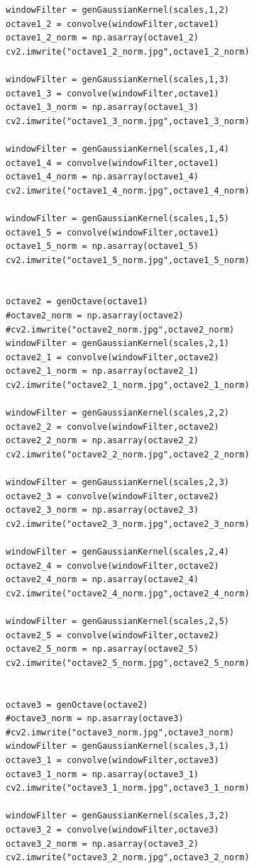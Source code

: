 \documentclass[12pt]{article}
\newenvironment{QandA}
{
	\begin{enumerate}[label=\normalfont\arabic*.,leftmargin=2em,rightmargin=2em]\normalfont
	}
	{
	\end{enumerate}
}
\newenvironment{codelalala}{}{}
\newenvironment{answered}{\setlength{\parindent}{1em}\par\normalfont}{}
\begin{document}
\begin{QandA}
\begin{answered}
\begin{codelalala}
\begin{verbatim}
windowFilter = genGaussianKernel(scales,1,2)
octave1_2 = convolve(windowFilter,octave1)
octave1_2_norm = np.asarray(octave1_2)
cv2.imwrite("octave1_2_norm.jpg",octave1_2_norm)

windowFilter = genGaussianKernel(scales,1,3)
octave1_3 = convolve(windowFilter,octave1)
octave1_3_norm = np.asarray(octave1_3)
cv2.imwrite("octave1_3_norm.jpg",octave1_3_norm)

windowFilter = genGaussianKernel(scales,1,4)
octave1_4 = convolve(windowFilter,octave1)
octave1_4_norm = np.asarray(octave1_4)
cv2.imwrite("octave1_4_norm.jpg",octave1_4_norm)

windowFilter = genGaussianKernel(scales,1,5)
octave1_5 = convolve(windowFilter,octave1)
octave1_5_norm = np.asarray(octave1_5)
cv2.imwrite("octave1_5_norm.jpg",octave1_5_norm)


octave2 = genOctave(octave1)
#octave2_norm = np.asarray(octave2)
#cv2.imwrite("octave2_norm.jpg",octave2_norm)
windowFilter = genGaussianKernel(scales,2,1)
octave2_1 = convolve(windowFilter,octave2)
octave2_1_norm = np.asarray(octave2_1)
cv2.imwrite("octave2_1_norm.jpg",octave2_1_norm)

windowFilter = genGaussianKernel(scales,2,2)
octave2_2 = convolve(windowFilter,octave2)
octave2_2_norm = np.asarray(octave2_2)
cv2.imwrite("octave2_2_norm.jpg",octave2_2_norm)

windowFilter = genGaussianKernel(scales,2,3)
octave2_3 = convolve(windowFilter,octave2)
octave2_3_norm = np.asarray(octave2_3)
cv2.imwrite("octave2_3_norm.jpg",octave2_3_norm)

windowFilter = genGaussianKernel(scales,2,4)
octave2_4 = convolve(windowFilter,octave2)
octave2_4_norm = np.asarray(octave2_4)
cv2.imwrite("octave2_4_norm.jpg",octave2_4_norm)

windowFilter = genGaussianKernel(scales,2,5)
octave2_5 = convolve(windowFilter,octave2)
octave2_5_norm = np.asarray(octave2_5)
cv2.imwrite("octave2_5_norm.jpg",octave2_5_norm)


octave3 = genOctave(octave2)
#octave3_norm = np.asarray(octave3)
#cv2.imwrite("octave3_norm.jpg",octave3_norm)
windowFilter = genGaussianKernel(scales,3,1)
octave3_1 = convolve(windowFilter,octave3)
octave3_1_norm = np.asarray(octave3_1)
cv2.imwrite("octave3_1_norm.jpg",octave3_1_norm)

windowFilter = genGaussianKernel(scales,3,2)
octave3_2 = convolve(windowFilter,octave3)
octave3_2_norm = np.asarray(octave3_2)
cv2.imwrite("octave3_2_norm.jpg",octave3_2_norm)


\end{verbatim}
\end{codelalala}
\end{answered}
\end{QandA}
\end{document}
